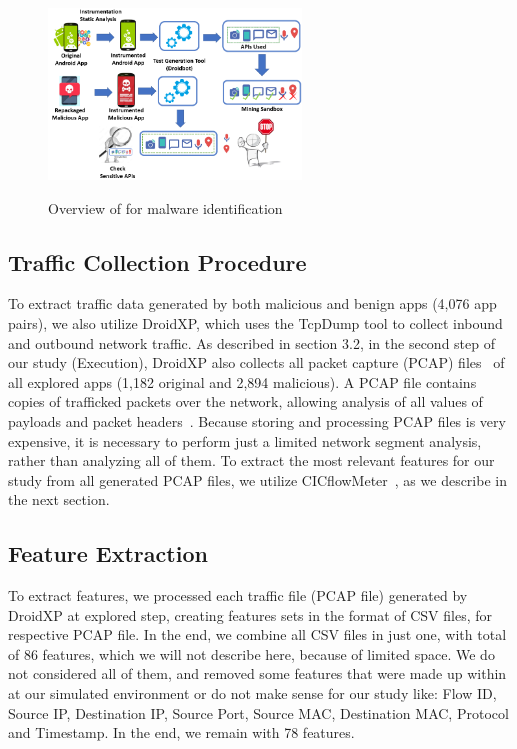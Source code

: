 \begin{figure}[h]
  \centering
  
    \includegraphics[width=0.60\textwidth]{image/mineSandbox.png} \\[\abovecaptionskip]
    
  \caption{Overview of \mas for malware identification}\label{fig:mine}
\end{figure}


\subsection{Traffic Collection Procedure}\label{sec:traffic}

To extract traffic data generated by both malicious and benign apps (4,076 app pairs), we also utilize DroidXP, which uses the TcpDump tool to collect inbound and outbound network traffic. As described in section 3.2, in the second step of our study (Execution), DroidXP also collects all packet capture (PCAP) files~\cite{DBLP:conf/iv/UhlarHR21} of all explored apps (1,182 original and 2,894 malicious). A PCAP file contains copies of trafficked packets over the network, allowing analysis of all values of payloads and packet headers~\cite{DBLP:conf/iv/UhlarHR21}. Because storing and processing PCAP files is very expensive, it is necessary to perform just a limited network segment analysis, rather than analyzing all of them. To extract the most relevant features for our study from all generated PCAP files, we utilize CICflowMeter~\cite{DBLP:conf/icissp/LashkariDMG17}, as we describe in the next section.

\subsection{Feature Extraction}\label{sec:extraction}

To extract features, we processed each traffic file (PCAP file) generated by DroidXP at explored step, creating features sets in the format of CSV files, for respective PCAP file. In the end, we combine all CSV files in just one, with total of 86 features, which we will not describe here, because of limited space. We do not considered all of them, and removed some features that were made up within at our simulated environment or do not make sense for our study like: Flow ID, Source IP, Destination IP, Source Port, Source MAC, Destination MAC, Protocol and Timestamp. In the end, we remain with 78 features.

